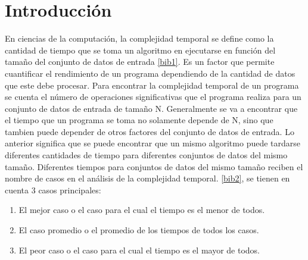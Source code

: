 \section{Introducción}
En ciencias de la computación, la complejidad temporal se define como la cantidad de tiempo que se toma un algoritmo en ejecutarse en función del tamaño del conjunto de datos de entrada \ref{bib1}. Es un factor que permite cuantificar el rendimiento de un programa dependiendo de la cantidad de datos que este debe procesar. Para encontrar la complejidad temporal de un programa se cuenta el número de operaciones significativas que el programa realiza para un conjunto de datos de entrada de tamaño N. Generalmente se va a encontrar que el tiempo que un programa se toma no solamente depende de N, sino que tambien puede depender de otros factores del conjunto de datos de entrada. Lo anterior significa que se puede encontrar que un mismo algoritmo puede tardarse diferentes cantidades de tiempo para diferentes conjuntos de datos del mismo tamaño. Diferentes tiempos para conjuntos de datos del mismo tamaño reciben el nombre de casos en el análisis de la complejidad temporal. \ref{bib2}, se tienen en cuenta 3 casos principales:

\begin{enumerate}
    \item El mejor caso o el caso para el cual el tiempo es el menor de todos.
    \item El caso promedio o el promedio de los tiempos de todos los casos.
    \item El peor caso o el caso para el cual el tiempo es el mayor de todos.
\end{enumerate}

